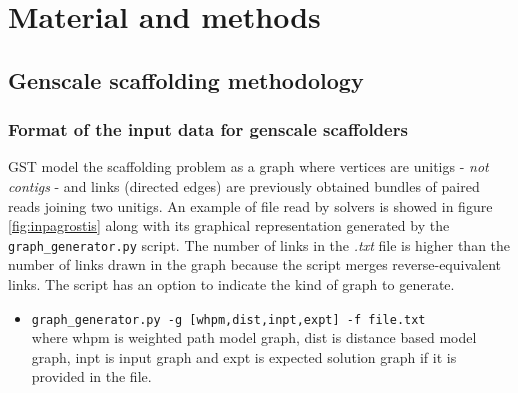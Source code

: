 \documentclass[12pt]{article}
\begin{document}

\newpage
\section{Material and methods} \label{sec:MatMet}
\subsection{Genscale scaffolding methodology}\label{sec:genscafmeth}
\subsubsection{Format of the input data for genscale scaffolders}
GST model the scaffolding problem as a graph where vertices are unitigs - \textit{not contigs} - and links (directed edges) are previously obtained bundles of paired reads joining two unitigs. An example of file read by solvers is showed in figure \ref{fig:inpagrostis} along with its graphical representation generated by the \texttt{graph\_generator.py} script. The number of links in the \textit{.txt} file is higher than the number of links drawn in the graph because the script merges reverse-equivalent links. The script has an option to indicate the kind of graph to generate. 
\begin{itemize}
\item \texttt{graph\_generator.py -g [whpm,dist,inpt,expt] -f file.txt}\\ where whpm is weighted path model graph, dist is distance based model graph, inpt is input graph and expt is expected solution graph if it is provided in the file.
\end{itemize}
\end{document}
